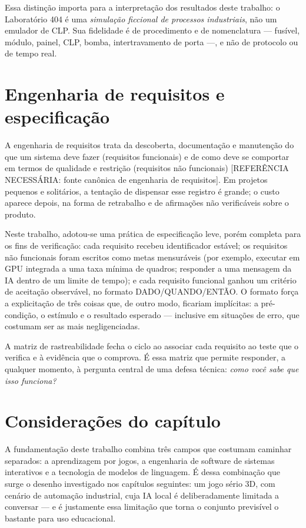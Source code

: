 Essa distinção importa para a interpretação dos resultados deste trabalho: o
Laboratório 404 é uma \emph{simulação ficcional de processos industriais}, não
um emulador de CLP. Sua fidelidade é de procedimento e de nomenclatura ---
fusível, módulo, painel, CLP, bomba, intertravamento de porta ---, e não de
protocolo ou de tempo real.

\section{Engenharia de requisitos e especificação}
\label{sec:requisitos}

A engenharia de requisitos trata da descoberta, documentação e manutenção do
que um sistema deve fazer (requisitos funcionais) e de como deve se comportar
em termos de qualidade e restrição (requisitos não funcionais)
[REFERÊNCIA NECESSÁRIA: fonte canônica de engenharia de requisitos]. Em
projetos pequenos e solitários, a tentação de dispensar esse registro é
grande; o custo aparece depois, na forma de retrabalho e de afirmações não
verificáveis sobre o produto.

Neste trabalho, adotou-se uma prática de especificação leve, porém completa
para os fins de verificação: cada requisito recebeu identificador estável; os
requisitos não funcionais foram escritos como metas mensuráveis (por exemplo,
executar em GPU integrada a uma taxa mínima de quadros; responder a uma
mensagem da IA dentro de um limite de tempo); e cada requisito funcional
ganhou um critério de aceitação observável, no formato DADO/QUANDO/ENTÃO. O
formato força a explicitação de três coisas que, de outro modo, ficariam
implícitas: a pré-condição, o estímulo e o resultado esperado --- inclusive em
situações de erro, que costumam ser as mais negligenciadas.

A matriz de rastreabilidade fecha o ciclo ao associar cada requisito ao teste
que o verifica e à evidência que o comprova. É essa matriz que permite
responder, a qualquer momento, à pergunta central de uma defesa técnica:
\emph{como você sabe que isso funciona?}

\section{Considerações do capítulo}
\label{sec:consideracoes_fundamentacao}

A fundamentação deste trabalho combina três campos que costumam caminhar
separados: a aprendizagem por jogos, a engenharia de software de sistemas
interativos e a tecnologia de modelos de linguagem. É dessa combinação que
surge o desenho investigado nos capítulos seguintes: um jogo sério 3D, com
cenário de automação industrial, cuja IA local é deliberadamente limitada a
conversar --- e é justamente essa limitação que torna o conjunto previsível o
bastante para uso educacional.
